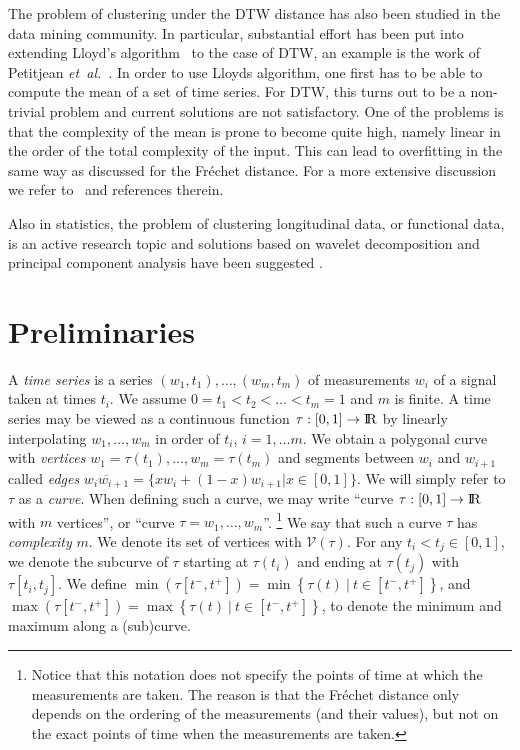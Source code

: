 \documentclass[11pt, letter]{article}
\newcommand{\etal}{\textit{e{}t~a{}l.}\xspace}
\newcommand{\Frechet}{Fr\'echet\xspace}
\providecommand{\brc}[1]{\left\{ {#1} \right\}}
\renewcommand{\Re}{{\rm I\!\hspace{-0.025em} R}}
\newcommand{\VtxSet}{\ensuremath{\mathcal{V}}}
\newcommand{\setSubC}[4]{\ensuremath{\brc{ #1(#2) ~|~ #2 \in [#3,#4]} }}
\newcommand{\minSubC}[4]{\ensuremath{\min( #1[#3,#4])}}
\newcommand{\maxSubC}[4]{\ensuremath{\max( #1[#3,#4])}}
\begin{document}
The problem of clustering under the DTW distance has also been studied in the data mining community. In particular, substantial effort has been put into extending Lloyd's algorithm~\cite{lloyd82} to the case of DTW, an example is the work of Petitjean \etal~\cite{Petitjean2011678}. In order to use Lloyds algorithm, one first has to be able to compute the mean of a set of time series. For DTW, this turns out to be a non-trivial problem and current solutions are not satisfactory.  One of the problems is that the complexity of the mean is prone to become quite high, namely linear in the order of the total complexity of the input. This can lead to overfitting in the same way as discussed for the \Frechet distance. For a more extensive discussion we refer to~\cite{ar-dcaa-2013} and references therein.

Also in statistics, the problem of clustering longitudinal data, or functional data, is an active research topic and solutions based on wavelet decomposition and principal component analysis have been suggested \cite{cmp-fcis-07, jp-fdc-13, rm-fcbwm-06, wsh-cbc-06}.

\section{Preliminaries}

A \emph{time series} is a series $(w_1,t_1),\ldots ,(w_m,t_m)$ of measurements
$w_i$ of a signal taken at times $t_i$. We assume $0=t_1<t_2<\ldots <t_m=1$ and $m$ is finite. A
time series may be viewed as a continuous function $\tau: [0,1] \rightarrow \Re$ by
linearly interpolating $w_1,\dots,w_m$ in order of $t_i$, $i=1,\ldots m$. We
obtain a polygonal curve with \emph{vertices} $w_1=\tau(t_1),\dots,
w_m=\tau(t_m)$ and segments between $w_i$ and $w_{i+1}$ called \emph{edges}
$\overline{w_i w_{i+1}}=\{xw_i+(1-x)w_{i+1}|x\in [0,1]\}$. We will simply refer
to $\tau$ as a \emph{curve}. 
When defining such a curve, we may write ``curve $\tau:[0,1]\rightarrow\Re$ with $m$
vertices'', or ``curve $\tau=w_1,\ldots, w_m$''.
\footnote{Notice that this notation does not specify the points of time at which the measurements
are taken. The reason is that the \Frechet distance only depends on the ordering of
the measurements (and their values), but not on the exact points of time when the measurements
are taken.}
We say that such a curve $\tau$ has \emph{complexity} $m$. 
We denote its set of vertices with  $\VtxSet(\tau)$. For
any $t_i<t_j \in [0,1]$, we denote the subcurve of $\tau$ starting at
$\tau(t_i)$ and ending at $\tau(t_j)$ with $\tau[t_i,t_j]$. 
We define 
$\minSubC{\tau}{t}{t^{-}}{t^{+}}=\min\setSubC{\tau}{t}{t^{-}}{t^{+}}$, and
$\maxSubC{\tau}{t}{t^{-}}{t^{+}}=\max\setSubC{\tau}{t}{t^{-}}{t^{+}}$, 
to denote the minimum and maximum along a (sub)curve.
\end{document}
